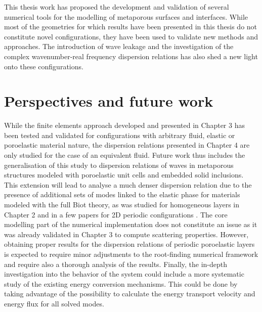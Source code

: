 This thesis work has proposed the development and validation of several {numerical tools} for the modelling of metaporous surfaces and interfaces. While most of the geometries for which results have been presented in this thesis do not constitute novel configurations, they have been used to {validate new methods and approaches}. The introduction of wave leakage and the investigation of the complex wavenumber-real frequency dispersion relations has also shed a new light onto these configurations.

\section*{Perspectives and future work}
{ {}}

While the finite elements approach developed and presented in Chapter 3 has been tested and validated for configurations with arbitrary fluid, elastic or poroelastic material nature, the dispersion relations presented in Chapter 4 are only studied for the case of an equivalent fluid. Future work thus includes the generalisation of this study to dispersion relations of waves in metaporous structures modeled with poroelastic unit cells and embedded solid inclusions. This extension will lead to analyse a much denser dispersion relation due to the presence of additional sets of modes linked to the elastic phase for materials modeled with the full Biot theory, as was studied for homogeneous layers in Chapter 2 and in a few papers for 2D periodic configurations \cite{wang2020,zhang2023}. The core modelling part of the numerical implementation does not constitute an issue as it was already validated in Chapter 3 to compute scattering properties. However, obtaining proper results for the dispersion relations of periodic poroelastic layers is expected to require minor adjustments to the root-finding numerical framework and require also a thorough analysis of the results. Finally, the in-depth investigation into the behavior of the system could include a more systematic study of the existing energy conversion mechanisms. This could be done by taking advantage of the possibility to calculate the energy transport velocity and energy flux for all solved modes.\\

